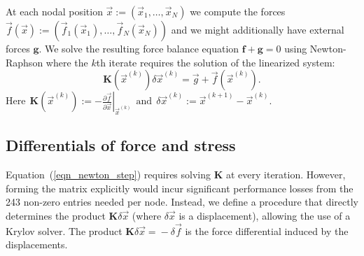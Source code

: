 At each nodal position $\vec{x}:=(\vec{x}_1,\ldots,\vec{x}_N)$ we compute the
forces $\vec{f}(\vec{x}):=(\vec{f}_1(\vec{x}_1),\ldots,\vec{f}_N(\vec{x}_N))$
and we might additionally have external forces $\mathbf{g}$. We solve
the resulting force balance equation $\mathbf{f}+\mathbf{g}=0$ using
Newton-Raphson where the $k$th iterate requires the solution of the linearized
system:
\begin{equation}
\mathbf{K}(\vec{x}^{(k)})\delta\vec{x}^{(k)}=\vec{g}+\vec{f}(\vec{x}^{(k)}).
\label{eqn_newton_step}
\end{equation}
$
\mbox{Here}\ \ 
\mathbf{K}(\vec{x}^{(k)}):=-\left.\frac{\partial\vec{f}}{\partial\vec{x}}\right|_{\vec{x}^{(k)}}
\ \ \mbox{and}\ \ 
\delta\vec{x}^{(k)}:=\vec{x}^{(k+1)}\!-\!\vec{x}^{(k)}
$.

\subsection{Differentials of force and stress}


Equation~(\ref{eqn_newton_step}) requires solving $\mathbf{K}$ at every
iteration. However, forming the matrix explicitly would incur significant performance losses from the 243 non-zero entries needed per node. Instead, we define a procedure that directly
determines the product $\mathbf{K}\delta\vec{x}$ (where $\delta\vec{x}$ is a
displacement), allowing the use of a Krylov solver. The product
$\mathbf{K}\delta\vec{x}\!=\!-\delta\vec{f}$ is the force differential induced
by the displacements.




